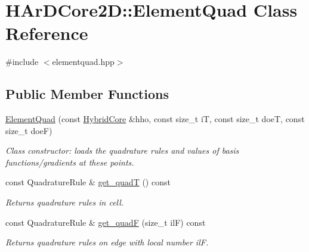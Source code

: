 \hypertarget{classHArDCore2D_1_1ElementQuad}{}\section{H\+Ar\+D\+Core2D\+:\+:Element\+Quad Class Reference}
\label{classHArDCore2D_1_1ElementQuad}


{\ttfamily \#include $<$elementquad.\+hpp$>$}

\subsection*{Public Member Functions}
\begin{DoxyCompactItemize}
\item 
\hyperlink{classHArDCore2D_1_1ElementQuad_a0d27ba99f9f3e6f2a3e5311e6be19eba}{Element\+Quad} (const \hyperlink{classHArDCore2D_1_1HybridCore}{Hybrid\+Core} \&hho, const size\+\_\+t iT, const size\+\_\+t doeT, const size\+\_\+t doeF)
\begin{DoxyCompactList}\small\item\em Class constructor\+: loads the quadrature rules and values of basis functions/gradients at these points. \end{DoxyCompactList}\item 
\mbox{\label{classHArDCore2D_1_1ElementQuad_a213822f156a19022e6bff238d438606d}} 
const Quadrature\+Rule \& \hyperlink{classHArDCore2D_1_1ElementQuad_a213822f156a19022e6bff238d438606d}{get\+\_\+quadT} () const
\begin{DoxyCompactList}\small\item\em Returns quadrature rules in cell. \end{DoxyCompactList}\item 
\mbox{\label{classHArDCore2D_1_1ElementQuad_a08c8a69abf1995ea353668beb8c5b19b}} 
const Quadrature\+Rule \& \hyperlink{classHArDCore2D_1_1ElementQuad_a08c8a69abf1995ea353668beb8c5b19b}{get\+\_\+quadF} (size\+\_\+t ilF) const
\begin{DoxyCompactList}\small\item\em Returns quadrature rules on edge with local number ilF. \end{DoxyCompactList}\item 
\mbox{\label{classHArDCore2D_1_1ElementQuad_a87443a1da538a16841f08e5a8c1dd8ee}} 

\end{DoxyCompactItemize}
